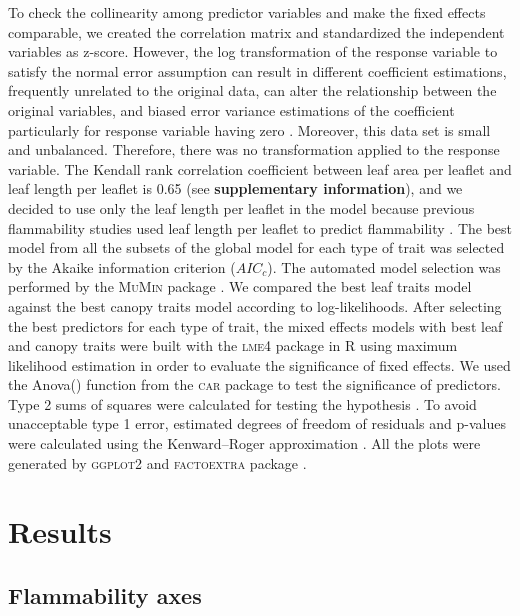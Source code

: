 \documentclass{bmcart}
\newcommand{\pkg}[1]{\textsc{#1}}
\begin{document}
To check the collinearity among predictor variables and make the fixed effects comparable, we created the correlation matrix and standardized the independent variables as z-score. However, the log transformation of the response variable to satisfy the normal error assumption can result in different coefficient estimations, frequently unrelated to the original data, can alter the relationship between the original variables, and biased error variance estimations of the coefficient particularly for response variable having zero \citep{mccuen1990problems,packard2008model,o2010not, changyong2014log, st2018count}. Moreover, this data set is small and unbalanced. Therefore, there was no transformation applied to the response variable. The Kendall rank correlation coefficient between leaf area per leaflet and leaf length per leaflet is 0.65 (see \textbf{supplementary information}), and we decided to use only the leaf length per leaflet in the model because previous flammability studies used leaf length per leaflet to predict flammability \citep{alam2020shoot}. 
The best model from all the subsets of the global model for each type of trait was selected by the Akaike information criterion ($AIC_{c}$). The automated model selection was performed by the \pkg{MuMin} package \citep{barton2015packagemumin}. We compared the best leaf traits model against the best canopy traits model according to log-likelihoods. After selecting the best predictors for each type of trait, the mixed effects models with best leaf and canopy traits were built with the \pkg{lme4} package in R \citep{bates2009package} using maximum likelihood estimation in order to evaluate the significance of fixed effects. We used the Anova() function from the \pkg{car} package \citep{fox2013hypothesis} to test the significance of predictors. Type  2  sums  of  squares  were  calculated  for testing the hypothesis \citep{langsrud2003anova}. To avoid unacceptable type 1 error, estimated degrees of freedom of residuals and p-values were calculated using the Kenward--Roger approximation \citep{kenward1997small}. All the plots were generated by \pkg{ggplot2} and \pkg{factoextra} package \citep{wickham2016packageggplot2, kassambara2017packagefactoextra}.



\section*{Results}

\subsection*{Flammability axes}
\end{document}
